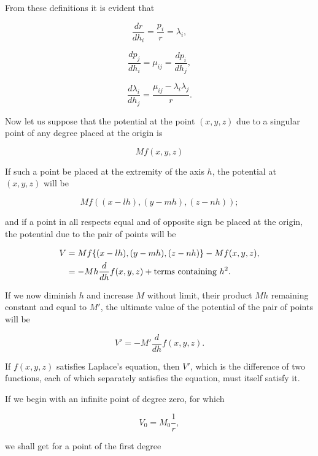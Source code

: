 \documentclass[11pt,a4paper]{article}
\begin{document}
From these definitions it is evident that

\begin{equation}\tag{6}
\frac{dr}{dh_i}=\frac{p_i}{r}=\lambda_i,
\end{equation}

\begin{equation}\tag{7}
\frac{dp_j}{dh_i}=\mu_{ij}=\frac{dp_i}{dh_j},
\end{equation}

\begin{equation}\tag{8}
\frac{d\lambda_i}{dh_j}=\frac{\mu_{ij}-\lambda_i\lambda_j}{r}.
\end{equation}

Now let us suppose that the potential at the point $(x,y,z)$ due to a singular point of any degree placed at the origin is

\[
Mf(x, y, z)
\]

If such a point be placed at the extremity of the axis $h$, the potential at $(x,y,z)$ will be

\[
Mf((x-lh), (y-mh), (z-nh));
\]

\setcounter{footnote}{0}
and if a point in all respects equal and of opposite sign be placed at the origin, the potential due to the pair of points will be

\[
\begin{aligned}
V&=Mf\{(x-lh),(y-mh),(z-nh)\}-Mf(x,y,z),\\
&=-Mh\frac{d}{dh}f(x,y,z)+\hbox{terms containing }h^2.
\end{aligned}
\]

If we now diminish $h$ and increase $M$ without limit, their product $Mh$ remaining constant and equal to $M'$, the ultimate value of the potential of the pair of points will be

\begin{equation}\tag{9}
V' = -M' \frac{d}{dh} f(x, y, z).
\end{equation}

If $f(x,y,z)$ satisfies Laplace's equation, then $V'$, which is the difference of two functions, each of which separately satisfies the equation, must itself satisfy it.

If we begin with an infinite point of degree zero, for which

\begin{equation}\tag{10}
V_0 = M_0 \frac{1}{r},
\end{equation}

we shall get for a point of the first degree
\end{document}
